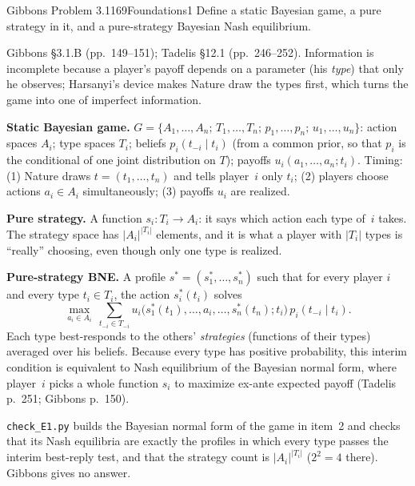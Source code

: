 \begin{exsol}{Gibbons Problem 3.1}{169}{Foundations}{1}
\asked Define a static Bayesian game, a pure strategy in it, and a pure-strategy Bayesian Nash
equilibrium.

\method Gibbons \S3.1.B (pp.~149--151); Tadelis \S12.1 (pp.~246--252). Information is
incomplete because a player's payoff depends on a parameter (his \emph{type}) that only he
observes; Harsanyi's device makes Nature draw the types first, which turns the game into one
of imperfect information.

\solution
\textbf{Static Bayesian game.} $G=\{A_1,\dots,A_n;\,T_1,\dots,T_n;\,p_1,\dots,p_n;\,u_1,\dots,u_n\}$:
action spaces $A_i$; type spaces $T_i$; beliefs $p_i(t_{-i}\mid t_i)$ (from a common prior, so
that $p_i$ is the conditional of one joint distribution on $T$); payoffs $u_i(a_1,\dots,a_n;t_i)$.
Timing: (1) Nature draws $t=(t_1,\dots,t_n)$ and tells player~$i$ only $t_i$; (2) players choose
actions $a_i\in A_i$ simultaneously; (3) payoffs $u_i$ are realized.

\textbf{Pure strategy.} A function $s_i:T_i\to A_i$: it says which action each type of~$i$
takes. The strategy space has $|A_i|^{|T_i|}$ elements, and it is what a player with
$|T_i|$ types is ``really'' choosing, even though only one type is realized.

\textbf{Pure-strategy BNE.} A profile $s^*=(s_1^*,\dots,s_n^*)$ such that for every player $i$
and every type $t_i\in T_i$, the action $s_i^*(t_i)$ solves
\[
  \max_{a_i\in A_i}\ \sum_{t_{-i}\in T_{-i}} u_i\bigl(s_1^*(t_1),\dots,a_i,\dots,s_n^*(t_n);t_i\bigr)\,p_i(t_{-i}\mid t_i).
\]
Each type best-responds to the others' \emph{strategies} (functions of their types) averaged
over his beliefs. Because every type has positive probability, this interim condition is
equivalent to Nash equilibrium of the Bayesian normal form, where player~$i$ picks a whole
function $s_i$ to maximize ex-ante expected payoff (Tadelis p.~251; Gibbons p.~150).

\verify \texttt{check\_E1.py} builds the Bayesian normal form of the game in item~2 and checks
that its Nash equilibria are exactly the profiles in which every type passes the interim
best-reply test, and that the strategy count is $|A_i|^{|T_i|}$ ($2^2=4$ there). Gibbons gives no
answer.

\end{exsol}
